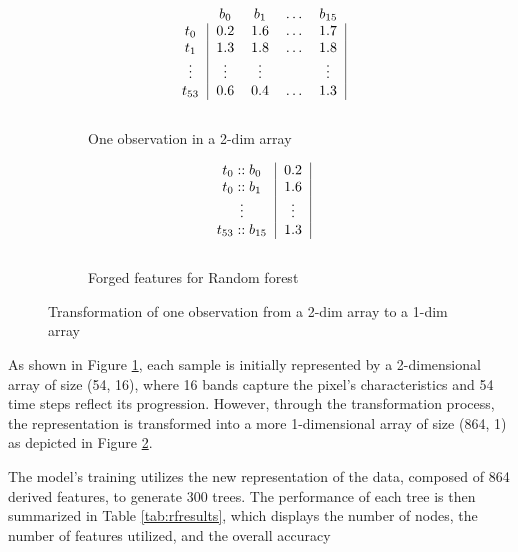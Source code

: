 \begin{figure}[!htbp]
  \begin{subfigure}{.5\textwidth}
    \centering
    \[
      \begin{blockarray}{ccccc}
        & b_0 & b_1 & \dots & b_{15} \\
        \begin{block}{c|cccc|}
          t_0 & 0.2 & 1.6 & \dots & 1.7  \\
          t_1 & 1.3 & 1.8 & \dots & 1.8 \\
          \vdots & \vdots & \vdots &  & \vdots   \\
          t_{53} & 0.6 & 0.4 & \dots & 1.3 \\
        \end{block}
      \end{blockarray}
    \]
    \caption{One observation in a 2-dim array}
    \label{fig:figtrans1}
  \end{subfigure}%
  \begin{subfigure}{.5\textwidth}
    \centering
    \[
      \begin{blockarray}{cc}
      \begin{block}{c|c|}
        t_0::b_0 & 0.2 \\
        t_0::b_1 & 1.6 \\
        \vdots & \vdots \\
        t_{53}::b_{15} & 1.3 \\
      \end{block}
      \end{blockarray}
    \]
    \caption{Forged features for Random forest}
    \label{fig:figtrans2}
  \end{subfigure}
  \caption{Transformation of one observation from a 2-dim array to a 1-dim array}
  \label{fig:figtrans}
\end{figure}

As shown in Figure \ref{fig:figtrans1}, each sample is initially represented by a 2-dimensional array of size (54, 16), where 16 bands capture the pixel's characteristics and 54 time steps reflect its progression. 
However, through the transformation process, the representation is transformed into a more 1-dimensional array of size (864, 1) as depicted in Figure \ref{fig:figtrans2}. 

The model's training utilizes the new representation of the data, composed of 864 derived features, to generate 300 trees.
The performance of each tree is then summarized in Table \ref{tab:rfresults}, which displays the number of nodes, the number of features utilized, and the overall accuracy

